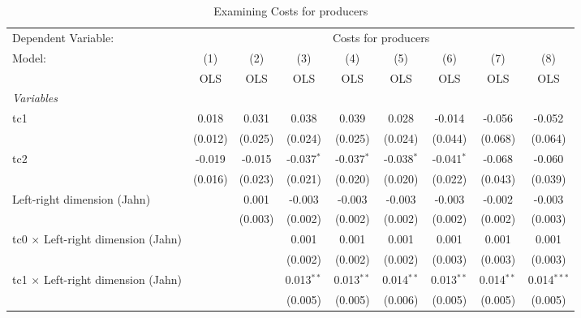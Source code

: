 
\begin{table}[htbp]
   \caption{Examining Costs for producers}
   \centering
   \begin{tabular}{lcccccccc}
      \toprule
      Dependent Variable: & \multicolumn{8}{c}{Costs for producers}\\
      Model:                                    & (1)     & (2)     & (3)          & (4)          & (5)          & (6)          & (7)          & (8)\\  
                                                &  OLS    & OLS     & OLS          & OLS          & OLS          & OLS          & OLS          & OLS\\  
      \midrule
      \emph{Variables}\\
      tc1                                       & 0.018   & 0.031   & 0.038        & 0.039        & 0.028        & -0.014       & -0.056       & -0.052\\   
                                                & (0.012) & (0.025) & (0.024)      & (0.025)      & (0.024)      & (0.044)      & (0.068)      & (0.064)\\   
      tc2                                       & -0.019  & -0.015  & -0.037$^{*}$ & -0.037$^{*}$ & -0.038$^{*}$ & -0.041$^{*}$ & -0.068       & -0.060\\   
                                                & (0.016) & (0.023) & (0.021)      & (0.020)      & (0.020)      & (0.022)      & (0.043)      & (0.039)\\   
      Left-right dimension (Jahn)               &         & 0.001   & -0.003       & -0.003       & -0.003       & -0.003       & -0.002       & -0.003\\   
                                                &         & (0.003) & (0.002)      & (0.002)      & (0.002)      & (0.002)      & (0.002)      & (0.003)\\   
      tc0 $\times$ Left-right dimension (Jahn)  &         &         & 0.001        & 0.001        & 0.001        & 0.001        & 0.001        & 0.001\\   
                                                &         &         & (0.002)      & (0.002)      & (0.002)      & (0.003)      & (0.003)      & (0.003)\\   
      tc1 $\times$ Left-right dimension (Jahn)  &         &         & 0.013$^{**}$ & 0.013$^{**}$ & 0.014$^{**}$ & 0.013$^{**}$ & 0.014$^{**}$ & 0.014$^{***}$\\   
                                                &         &         & (0.005)      & (0.005)      & (0.006)      & (0.005)      & (0.005)      & (0.005)\\   

\end{tabular}
\end{table}
